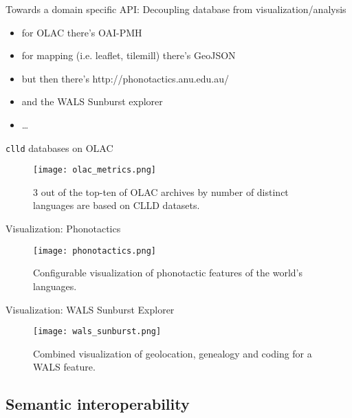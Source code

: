 \documentclass{beamer}
\begin{document}
\begin{frame}{Towards a domain specific API: Decoupling database from visualization/analysis}
\begin{itemize}
\item for OLAC there's OAI-PMH
\item for mapping (i.e. leaflet, tilemill) there's GeoJSON
\item but then there's http://phonotactics.anu.edu.au/
\item and the WALS Sunburst explorer
\item \dots
\end{itemize}
\end{frame}

\begin{frame}{\texttt{clld} databases on OLAC}
\begin{figure}
\texttt{[image: olac\_metrics.png]}
\caption{\label{fig:zenodo}3 out of the top-ten of OLAC archives by number of distinct languages
are based on CLLD datasets.}
\end{figure}
\end{frame}


\begin{frame}{Visualization: Phonotactics}
\begin{figure}
\texttt{[image: phonotactics.png]}
\caption{\label{fig:zenodo}Configurable visualization of phonotactic features of the
world's languages.}
\end{figure}
\end{frame}


\begin{frame}{Visualization: WALS Sunburst Explorer}
\begin{figure}
\texttt{[image: wals\_sunburst.png]}
\caption{\label{fig:zenodo}Combined visualization of geolocation, genealogy and coding
for a WALS feature.}
\end{figure}
\end{frame}


%
%
\subsection{Semantic interoperability}
\end{document}
